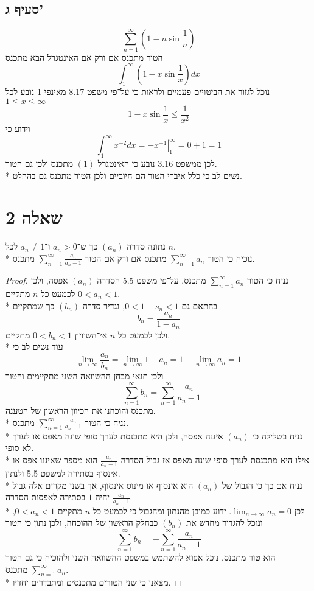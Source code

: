 \subsection{סעיף ג'}
\[
	\sum_{n = 1}^{\infty} \left( 1 - n \sin \frac{1}{n}\right)
\]
הטור מתכנס אם ורק אם האינטגרל הבא מתכנס
\[
	\int_{1}^{\infty} \left( 1 - x \sin \frac{1}{x}\right) dx \tag{1}
\]
נוכל לגזור את הביטויים פעמיים ולראות כי על־פי משפט 8.17 מאינפי 1 נובע לכל $1 \le x \le \infty$
\[
	 1 - x \sin \frac{1}{x} \le \frac{1}{x^2}
\]
וידוע כי
\[
	\int_{1}^{\infty} x^{-2} dx = \left. -x^{-1} \right|_1^\infty = 0 + 1 = 1
\]
לכן ממשפט 3.16 נובע כי האינטגרל $(1)$ מתכנס ולכן גם הטור. \\*
נשים לב כי כלל איברי הטור הם חיוביים ולכן הטור מתכנס גם בהחלט.

\section{שאלה 2}
נתונה סדרה $(a_n)$ כך ש־$a_n > 0$ ו־$a_n \ne 1$ לכל $n$. \\*
נוכיח כי הטור $\sum_{n = 1}^{\infty} a_n$ מתכנס אם ורק אם הטור $\sum_{n = 1}^{\infty} \frac{a_n}{a_n - 1}$ מתכנס.
\begin{proof}
	נניח כי הטור $\sum_{n = 1}^{\infty} a_n$ מתכנס, על־פי משפט 5.5 הסדרה $(a_n)$ אפסה, ולכן לכמעט כל $n$ מתקיים $0 < a_n < 1$. \\*
	בהתאם גם $0 < 1 - s_n < 1$, נגדיר סדרה $(b_n)$ כך שמתקיים
	\[
		b_n = \frac{a_n}{1 - a_n}
	\]
	ולכן לכמעט כל $n$ אי־השוויון $0 < b_n < 1$ מתקיים. \\*
	עוד נשים לב כי
	\[
		\lim_{n \to \infty} \frac{a_n}{b_n}
		= \lim_{n \to \infty} 1 - a_n
		= 1 - \lim_{n \to \infty} a_n = 1
	\]
	ולכן תנאי מבחן ההשוואה השני מתקיימים והטור
	\[
		- \sum_{n = 1}^{\infty} b_n = \sum_{n = 1}^{\infty} \frac{a_n}{a_n - 1}
	\]
	מתכנס והוכחנו את הכיוון הראשון של הטענה. \\*
	נניח כי הטור $\sum_{n = 1}^{\infty} \frac{a_n}{a_n - 1}$ מתכנס. \\*
	נניח בשלילה כי $(a_n)$ איננה אפסה, ולכן היא מתכנסת לערך סופי שונה מאפס או לערך לא סופי. \\*
	אילו היא מתכנסת לערך סופי שונה מאפס אז גבול הסדרה $\frac{a_n}{a_n - 1}$ הוא מספר שאיננו אפס או אינסוף בסתירה למשפט 5.5 ולנתון. \\*
	נניח אם כך כי הגבול של $(a_n)$ הוא אינסוף או מינוס אינסוף, אך בשני מקרים אלה גבול $\frac{a_n}{a_n - 1}$ יהיה $1$ בסתירה לאפסות הסדרה. \\*
	לכן $\lim_{n \to \infty} a_n = 0$. ידוע כמובן מהנתון ומהגבול כי לכמעט כל $n$ מתקיים $0 < a_n < 1$,
	ונוכל להגדיר מחדש את $(b_n)$ כבחלק הראשון של ההוכחה, ולכן נתון כי הטור
	\[
		\sum_{n = 1}^{\infty} b_n
		= -\sum_{n = 1}^{\infty} \frac{a_n}{a_n - 1}
	\]
	הוא טור מתכנס. נוכל אפוא להשתמש במשפט ההשוואה השני ולהוכיח כי גם הטור $\sum_{n = 1}^{\infty} a_n$ מתכנס. \\*
	מצאנו כי שני הטורים מתכנסים ומתבדרים יחדיו.
\end{proof}

